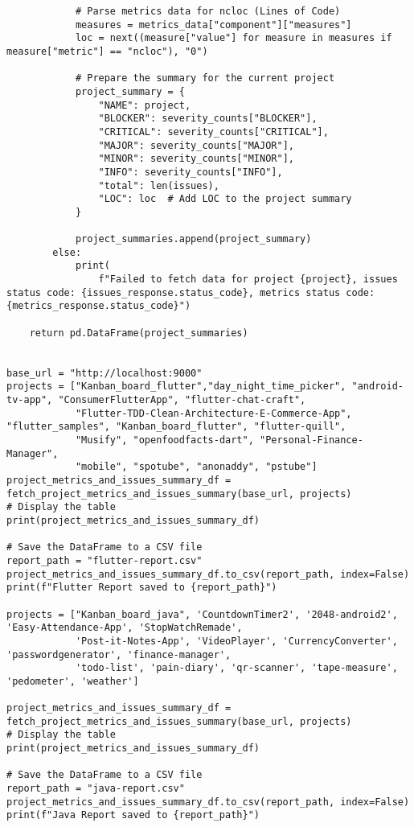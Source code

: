 \begin{lstlisting}
            # Parse metrics data for ncloc (Lines of Code)
            measures = metrics_data["component"]["measures"]
            loc = next((measure["value"] for measure in measures if measure["metric"] == "ncloc"), "0")

            # Prepare the summary for the current project
            project_summary = {
                "NAME": project,
                "BLOCKER": severity_counts["BLOCKER"],
                "CRITICAL": severity_counts["CRITICAL"],
                "MAJOR": severity_counts["MAJOR"],
                "MINOR": severity_counts["MINOR"],
                "INFO": severity_counts["INFO"],
                "total": len(issues),
                "LOC": loc  # Add LOC to the project summary
            }

            project_summaries.append(project_summary)
        else:
            print(
                f"Failed to fetch data for project {project}, issues status code: {issues_response.status_code}, metrics status code: {metrics_response.status_code}")

    return pd.DataFrame(project_summaries)


base_url = "http://localhost:9000"
projects = ["Kanban_board_flutter","day_night_time_picker", "android-tv-app", "ConsumerFlutterApp", "flutter-chat-craft",
            "Flutter-TDD-Clean-Architecture-E-Commerce-App", "flutter_samples", "Kanban_board_flutter", "flutter-quill",
            "Musify", "openfoodfacts-dart", "Personal-Finance-Manager",
            "mobile", "spotube", "anonaddy", "pstube"]
project_metrics_and_issues_summary_df = fetch_project_metrics_and_issues_summary(base_url, projects)
# Display the table
print(project_metrics_and_issues_summary_df)

# Save the DataFrame to a CSV file
report_path = "flutter-report.csv"
project_metrics_and_issues_summary_df.to_csv(report_path, index=False)
print(f"Flutter Report saved to {report_path}")

projects = ["Kanban_board_java", 'CountdownTimer2', '2048-android2', 'Easy-Attendance-App', 'StopWatchRemade',
            'Post-it-Notes-App', 'VideoPlayer', 'CurrencyConverter', 'passwordgenerator', 'finance-manager',
            'todo-list', 'pain-diary', 'qr-scanner', 'tape-measure', 'pedometer', 'weather']

project_metrics_and_issues_summary_df = fetch_project_metrics_and_issues_summary(base_url, projects)
# Display the table
print(project_metrics_and_issues_summary_df)

# Save the DataFrame to a CSV file
report_path = "java-report.csv"
project_metrics_and_issues_summary_df.to_csv(report_path, index=False)
print(f"Java Report saved to {report_path}")


\end{lstlisting}
